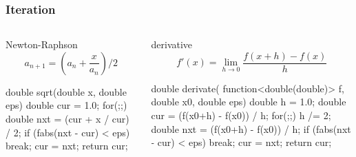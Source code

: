 \documentclass[UTF8,lualatex]{ctexbeamer}
\begin{document}
\begin{frame}[fragile,t]
    \frametitle{Iteration}
    \scriptsize
    \begin{columns}[t]
        \begin{column}{.5\textwidth}
            \begin{exampleblock}{Newton-Raphson}
                \[
                    a_{n+1} = (a_n + \frac{x}{a_n})/2
                \]
                \begin{cppcode}
                    double sqrt(double x, double eps) {
                      double cur = 1.0;
                      for(;;) {
                        double nxt = (cur + x / cur) / 2;
                        if (fabs(nxt - cur) < eps) break;
                        cur = nxt;
                      }
                      return cur;
                    }
                \end{cppcode}
            \end{exampleblock}
        \end{column}
        \begin{column}{.5\textwidth}
            \begin{block}{derivative}
                \[
                    f'(x) = \lim_{h\to 0}\frac{f(x+h) - f(x)}{h}
                \]
                \begin{cppcode}
                double derivate(
                    function<double(double)> f,
                    double x0,
                    double eps)
                {
                  double h = 1.0;
                  double cur = (f(x0+h) - f(x0)) / h;
                  for(;;) {
                    h /= 2;
                    double nxt = (f(x0+h) - f(x0)) / h;
                    if (fabs(nxt - cur) < eps) break;
                    cur = nxt;
                  }
                  return cur;
                }
                \end{cppcode}
            \end{block}
        \end{column}
    \end{columns}
\end{frame}

\end{document}

